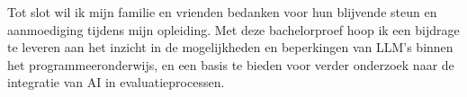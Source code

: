 \vspace{1em}

Tot slot wil ik mijn familie en vrienden bedanken voor hun blijvende steun en aanmoediging tijdens mijn opleiding. Met deze bachelorproef hoop ik een bijdrage te leveren aan het inzicht in de mogelijkheden en beperkingen van LLM’s binnen het programmeeronderwijs, en een basis te bieden voor verder onderzoek naar de integratie van AI in evaluatieprocessen.
